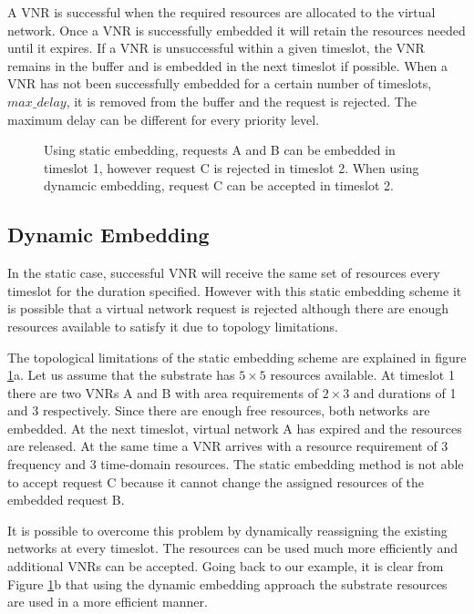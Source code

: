 \documentclass[conference]{IEEEtran}
\begin{document}
A VNR is successful when the required resources are allocated to the virtual network. Once a VNR is successfully embedded it will retain the resources needed until it expires. If a VNR is unsuccessful within a given timeslot, the VNR remains in the buffer and is embedded in the next timeslot if possible. When a VNR has not been successfully embedded for a certain number of timeslots, $max\_delay$, it is removed from the buffer and the request is rejected. The maximum delay can be different for every priority level.

\begin{figure}[!t]
\centering
   \hfill
   \hfill
   \caption{Using static embedding, requests A and B can be embedded in timeslot 1, however request C is rejected in timeslot 2. When using dynamcic embedding, request C can be accepted in timeslot 2.}\label{fig:1}
\end{figure}

\subsection{Dynamic Embedding}

In the static case, successful VNR will receive the same set of resources every timeslot for the duration specified. However with this static embedding scheme it is possible that a virtual network request is rejected although there are enough resources available to satisfy it due to topology limitations.

The topological limitations of the static embedding scheme are explained in figure \ref{fig:1}a. Let us assume that the substrate has $5 \times 5$ resources available. At timeslot 1 there are two VNRs A and B with area requirements of $2 \times 3$ and durations of 1 and 3 respectively. Since there are enough free resources, both networks are embedded. At the next timeslot, virtual network A has expired and the resources are released. At the same time a VNR arrives with a resource requirement of 3 frequency and 3 time-domain resources. The static embedding method is not able to accept request C because it cannot change the assigned resources of the embedded request B.

It is possible to overcome this problem by dynamically reassigning the existing networks at every timeslot. The resources can be used much more efficiently and additional VNRs can be accepted. Going back to our example, it is clear from Figure \ref{fig:1}b that using the dynamic embedding approach the substrate resources are used in a more efficient manner.
\end{document}

